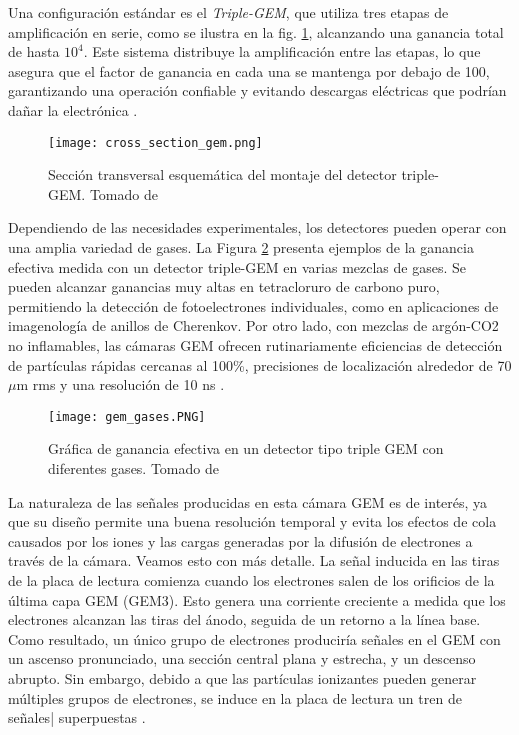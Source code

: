 \documentclass{report}
\begin{document}
\noindent Una configuración estándar es el \textit{Triple-GEM}, que utiliza tres etapas de amplificación en serie, como se ilustra en la fig. \ref{fig:cross_section}, alcanzando una ganancia total de hasta $10^4$. Este sistema distribuye la amplificación entre las etapas, lo que asegura que el factor de ganancia en cada una se mantenga por debajo de 100, garantizando una operación confiable y evitando descargas eléctricas que podrían dañar la electrónica \cite{bencivenni2002triple}.\\

\begin{figure}[H]
    \centering
    \texttt{[image: cross\_section\_gem.png]}
    \caption{Sección transversal esquemática del montaje del detector triple-GEM. Tomado de \cite{cross}}
    \label{fig:cross_section}
\end{figure}

\noindent Dependiendo de las necesidades experimentales, los detectores pueden operar con una amplia variedad de gases. La Figura \ref{fig:gem_gases} presenta ejemplos de la ganancia efectiva medida con un detector triple-GEM en varias mezclas de gases. Se pueden alcanzar ganancias muy altas en tetracloruro de carbono puro, permitiendo la detección de fotoelectrones individuales, como en aplicaciones de imagenología de anillos de Cherenkov. Por otro lado, con mezclas de argón-CO2 no inflamables, las cámaras GEM ofrecen rutinariamente eficiencias de detección de partículas rápidas cercanas al 100\%, precisiones de localización alrededor de 70 $\mu$m rms y una resolución de 10 ns \cite{ketzer2004performance}.

\begin{figure}[H]
    \centering
    \texttt{[image: gem\_gases.PNG]}
    \caption{Gráfica de ganancia efectiva en un detector tipo triple GEM con diferentes gases. Tomado de \cite{breskin2002gem}}
    \label{fig:gem_gases}
\end{figure}

\noindent La naturaleza de las señales producidas en esta cámara GEM es de interés, ya que su diseño permite una buena resolución temporal y evita los efectos de cola causados por los iones y las cargas generadas por la difusión de electrones a través de la cámara. Veamos esto con más detalle. La señal inducida en las tiras de la placa de lectura comienza cuando los electrones salen de los orificios de la última capa GEM (GEM3). Esto genera una corriente creciente a medida que los electrones alcanzan las tiras del ánodo, seguida de un retorno a la línea base. Como resultado, un único grupo de electrones produciría señales en el GEM con un ascenso pronunciado, una sección central plana y estrecha, y un descenso abrupto. Sin embargo, debido a que las partículas ionizantes pueden generar múltiples grupos de electrones, se induce en la placa de lectura un tren de señales| superpuestas \cite{mocellin2021performance}.\\
\end{document}
